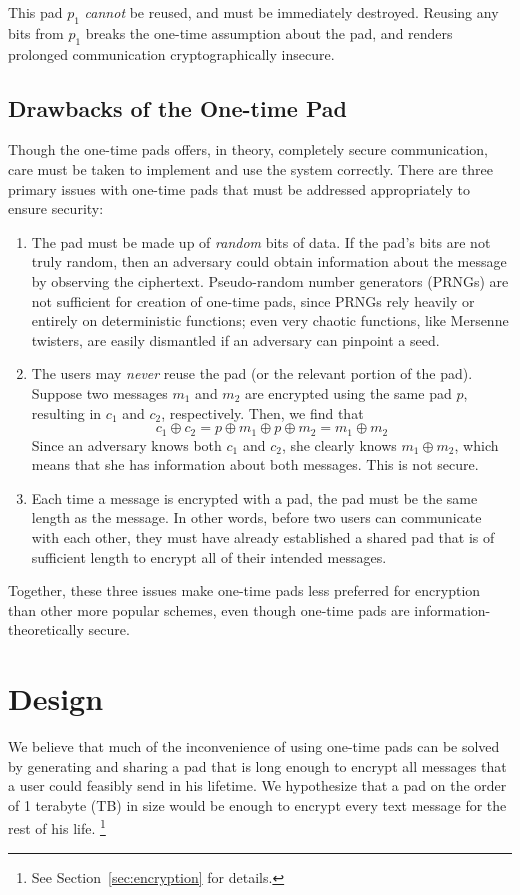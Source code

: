 \documentclass[twocolumn]{article}
\begin{document}
This pad $p_1$ \emph{cannot} be reused, and must be immediately destroyed. Reusing any bits from $p_1$ breaks the one-time assumption about the pad, and renders prolonged communication cryptographically insecure.

\subsection{Drawbacks of the One-time Pad}
Though the one-time pads offers, in theory, completely secure communication, care must be taken to implement and use the system correctly. There are three primary issues with one-time pads that must be addressed appropriately to ensure security:
\begin{enumerate}
\item The pad must be made up of \emph{random} bits of data. If the pad's bits are not truly random, then an adversary could obtain information about the message by observing the ciphertext. Pseudo-random number generators (PRNGs) are not sufficient for creation of one-time pads, since PRNGs rely heavily or entirely on deterministic functions; even very chaotic functions, like Mersenne twisters, are easily dismantled if an adversary can pinpoint a seed.
\item The users may \emph{never} reuse the pad (or the relevant portion of the pad). Suppose two messages $m_{1}$ and $m_{2}$ are encrypted using the same pad $p$, resulting in $c_1$ and $c_2$, respectively. Then, we find that
\[
c_{1} \oplus c_{2} = p \oplus m_{1} \oplus p \oplus m_{2}
= m_1 \oplus m_2
\]
Since an adversary knows both $c_1$ and $c_2$, she clearly knows $m_1 \oplus m_2$, which means that she has information about both messages. This is not secure.
\item Each time a message is encrypted with a pad, the pad must be the same length as the message. In other words, before two users can communicate with each other, they must have already established a shared pad that is of sufficient length to encrypt all of their intended messages.
\end{enumerate}
Together, these three issues make one-time pads less preferred for encryption than other more popular schemes, even though one-time pads are information-theoretically secure.

\section{Design}
We believe that much of the inconvenience of using one-time pads can be solved by generating and sharing a pad that is long enough to encrypt all messages that a user could feasibly send in his lifetime. We hypothesize that a pad on the order of 1 terabyte (TB) in size would be enough to encrypt every text message for the rest of his life. \footnote{
See Section~\ref{sec:encryption} for details.
}
\end{document}
